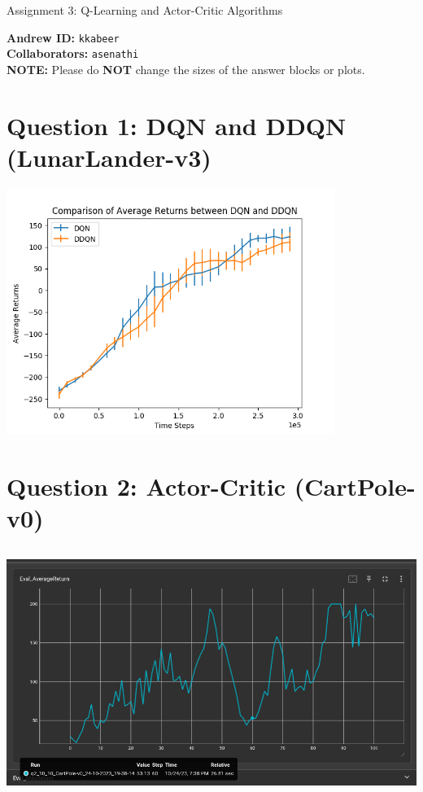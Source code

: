 \documentclass{article}
\begin{document}

\begin{centering}
    {\Large Assignment 3: Q-Learning and Actor-Critic Algorithms
} \\
    \vspace{.25cm}
\end{centering}
\vspace{0.25cm}

\textbf{Andrew ID:} \texttt{kkabeer} \\
\textbf{Collaborators:} \texttt{asenathi}\\ 
\textbf{NOTE:} Please do \textbf{NOT} change the sizes of the answer blocks or plots.

\setcounter{section}{0}
\section{Question 1: DQN and DDQN (LunarLander-v3)}
\begin{answer}[title=Question 1,height=9.5cm,width=\linewidth]
    
\centering
\includegraphics[height=8cm]{plot.png}
\end{answer}

\section{Question 2: Actor-Critic (CartPole-v0)}
\begin{answer}[title=Question 2,height=9.5cm,width=\linewidth]
\centering
\includegraphics[height=8cm]{q2.png}
\end{answer}
\end{document}
